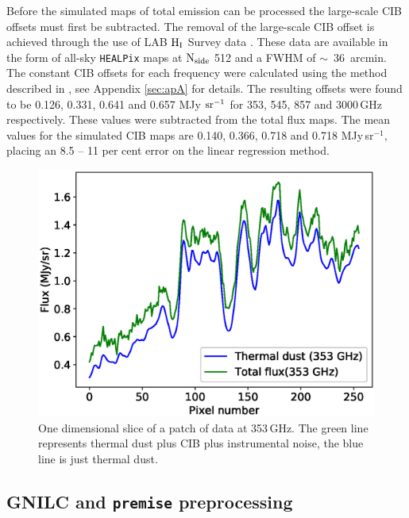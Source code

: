 \documentclass[a4paper,fleqn,usenatbib]{mnras}
\begin{document}
Before the simulated maps of total emission can be processed the large-scale CIB offsets must first be subtracted. The removal of the large-scale CIB offset is achieved through the use of LAB $\rm{H_{I}}$ Survey data \citep{lab}. These data are available in the form of all-sky {\texttt{HEALPix}} maps \citep{healpix} at $\rm{N_{side}}$ 512 and a FWHM of \mbox{$\sim$ 36 arcmin}. \footnotemark {} The constant CIB offsets for each frequency were calculated using the method described in \citet{pr2}, see Appendix \ref{sec:apA} for details. The resulting offsets were found to be 0.126, 0.331, 0.641 and 0.657 MJy $\rm{sr^{-1}}$ for 353, 545, 857 and 3000\,GHz respectively.  These values were subtracted from the total flux maps. The mean values for the simulated CIB maps are 0.140, 0.366, 0.718 and 0.718 MJy\,sr$^{-1}$, placing an 8.5 -- 11 per cent error on the linear regression method.

\begin{figure}
\centering
\includegraphics[width=0.8\linewidth]{ciboffset353face6}
\caption{One dimensional slice of a patch of data at 353\,GHz. The green line represents thermal dust plus CIB plus instrumental noise, the blue line is just thermal dust.}
\label{fig:ciboffset}
\end{figure}

\subsection{GNILC and {\texttt{premise}} preprocessing}
\end{document}
